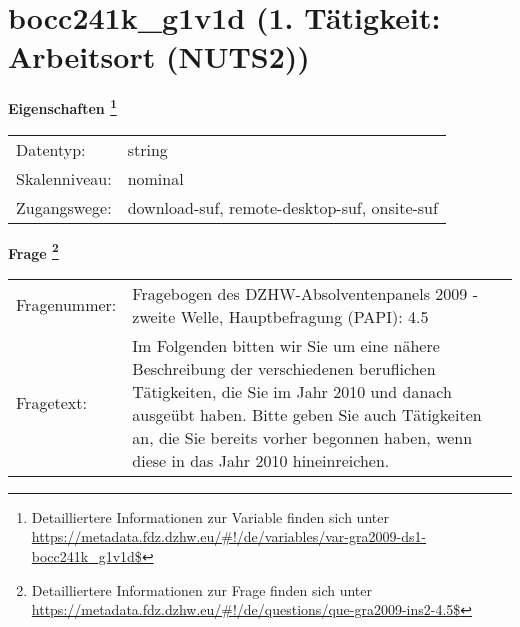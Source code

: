 
    \setcounter{footnote}{0}

    \vspace*{-1.8cm}
	\section{bocc241k\_g1v1d (1. Tätigkeit: Arbeitsort (NUTS2))}
	\label{section:bocc241k_g1v1d}



    \vspace*{0.5cm}
    \noindent\textbf{Eigenschaften
	\footnote{Detailliertere Informationen zur Variable finden sich unter
		\url{https://metadata.fdz.dzhw.eu/\#!/de/variables/var-gra2009-ds1-bocc241k_g1v1d$}}}\\
	\begin{tabularx}{\hsize}{@{}lX}
	Datentyp: & string \\
	Skalenniveau: & nominal \\
	Zugangswege: &
	  download-suf, 
	  remote-desktop-suf, 
	  onsite-suf
 \\
    \end{tabularx}



				\vspace*{0.5cm}
                \noindent\textbf{Frage
	                \footnote{Detailliertere Informationen zur Frage finden sich unter
		              \url{https://metadata.fdz.dzhw.eu/\#!/de/questions/que-gra2009-ins2-4.5$}}}\\
				\begin{tabularx}{\hsize}{@{}lX}
					Fragenummer: &
					  Fragebogen des DZHW-Absolventenpanels 2009 - zweite Welle, Hauptbefragung (PAPI):
					  4.5
 \\
					Fragetext: & Im Folgenden bitten wir Sie um eine nähere Beschreibung der verschiedenen beruflichen Tätigkeiten, die Sie im Jahr 2010 und danach ausgeübt haben. Bitte geben Sie auch Tätigkeiten an, die Sie bereits vorher begonnen haben, wenn diese in das Jahr 2010 hineinreichen. \\
				\end{tabularx}





